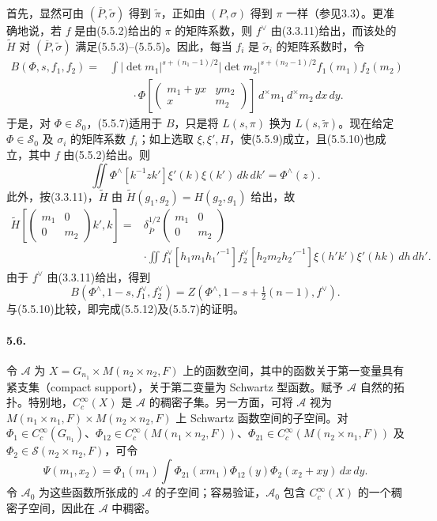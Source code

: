 首先，显然可由 $(\overline P,\widetilde\sigma)$ 得到 $\widetilde\pi$，正如由 $(P,\sigma)$ 得到 $\pi$ 一样（参见3.3）。更准确地说，若 $f$ 是由(5.5.2)给出的 $\pi$ 的矩阵系数，则 $f^\vee$ 由(3.3.11)给出，而该处的 $\widetilde H$ 对 $(\overline P,\widetilde\sigma)$ 满足(5.5.3)--(5.5.5)。因此，每当 $f_i$ 是 $\widetilde\sigma_i$ 的矩阵系数时，令
\[
\begin{split}
 B(\Phi,s,f_1,f_2)={}&\int |\det m_1|^{s+(n_1-1)/2}|\det m_2|^{s+(n_2-1)/2}
 f_1(m_1)f_2(m_2)\\
 &\qquad\cdot\Phi\!\left[\begin{pmatrix}m_1+yx&ym_2\\x&m_2\end{pmatrix}\right]
 \,d^\times m_1\,d^\times m_2\,dx\,dy.
\end{split}\tag{5.5.13}
\]
于是，对 $\Phi\in\mathcal S_0$，(5.5.7)适用于 $B$，只是将 $L(s,\pi)$ 换为 $L(s,\widetilde\pi)$。现在给定 $\Phi\in\mathcal S_0$ 及 $\sigma_i$ 的矩阵系数 $f_i$；如上选取 $\xi,\xi',H$，使(5.5.9)成立，且(5.5.10)也成立，其中 $f$ 由(5.5.2)给出。则
\[
 \iint\Phi^\wedge[k^{-1}zk']\xi'(k)\xi(k')\,dk\,dk'=\Phi^\wedge(z).
\]
此外，按(3.3.11)，$\widetilde H$ 由 $\widetilde H(g_1,g_2)=H(g_2,g_1)$ 给出，故
\[
\begin{split}
 \widetilde H\!\left[\begin{pmatrix}m_1&0\\0&m_2\end{pmatrix}k',k\right]
 ={}&\delta_{\overline P}^{1/2}\!\begin{pmatrix}m_1&0\\0&m_2\end{pmatrix}\\
 &\cdot\iint f_1^\vee[h_1m_1h_1'^{-1}]f_2^\vee[h_2m_2h_2'^{-1}]
 \xi(h'k')\xi'(hk)\,dh\,dh'.
\end{split}
\]
由于 $f^\vee$ 由(3.3.11)给出，得到
\[
 B(\Phi^\wedge,1-s,f_1^\vee,f_2^\vee)
 =Z(\Phi^\wedge,1-s+\tfrac12(n-1),f^\vee).
\]
与(5.5.10)比较，即完成(5.5.12)及(5.5.7)的证明。

\paragraph*{5.6.}
令 $\mathcal A$ 为 $X=G_{n_1}\times M(n_2\times n_2,F)$ 上的函数空间，其中的函数关于第一变量具有紧支集（compact support），关于第二变量为 Schwartz 型函数。赋予 $\mathcal A$ 自然的拓扑。特别地，$C_c^\infty(X)$ 是 $\mathcal A$ 的稠密子集。另一方面，可将 $\mathcal A$ 视为 $M(n_1\times n_1,F)\times M(n_2\times n_2,F)$ 上 Schwartz 函数空间的子空间。对 $\Phi_1\in C_c^\infty(G_{n_1})$、$\Phi_{12}\in C_c^\infty(M(n_1\times n_2,F))$、$\Phi_{21}\in C_c^\infty(M(n_2\times n_1,F))$ 及 $\Phi_2\in\mathcal S(n_2\times n_2,F)$，可令
\[
 \Psi(m_1,x_2)=\Phi_1(m_1)\int\Phi_{21}(xm_1)\Phi_{12}(y)\Phi_2(x_2+xy)\,dx\,dy.\tag{5.6.1}
\]
令 $\mathcal A_0$ 为这些函数所张成的 $\mathcal A$ 的子空间；容易验证，$\mathcal A_0$ 包含 $C_c^\infty(X)$ 的一个稠密子空间，因此在 $\mathcal A$ 中稠密。

